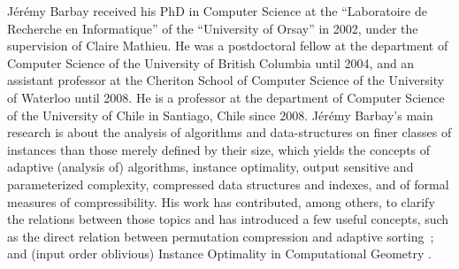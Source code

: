 \documentclass[a4paper,10pt]{article}
\begin{document}
J\'er\'emy Barbay received his PhD in Computer Science at the ``Laboratoire de Recherche en Informatique'' of the ``University of Orsay'' in 2002, under the supervision of Claire Mathieu.  He was a postdoctoral fellow at the department of Computer Science of the University of British Columbia until 2004, and an assistant professor at the Cheriton School of Computer Science of the University of Waterloo until 2008. He is a professor at the department of Computer Science of the University of Chile in Santiago, Chile since 2008.
%
J\'er\'emy Barbay's main research is about the analysis of algorithms and data-structures on finer classes of instances than those merely defined by their size, which yields the concepts of adaptive (analysis of) algorithms, instance optimality, output sensitive and parameterized complexity, compressed data structures and indexes, and of formal measures of compressibility.  His work has contributed, among others, to clarify the relations between those topics and has introduced a few useful concepts, such as the direct relation between permutation compression and adaptive sorting~\cite{2013-TCS-CompressedRepresentationsOfPermutationsAndApplications-BarbayNavarro};
 and (input order oblivious) Instance Optimality in Computational Geometry \cite{2009-FOCS-InstanceOptimalGeometricAlgorithms-AfshaniBarbayChan}. 
\end{document}

